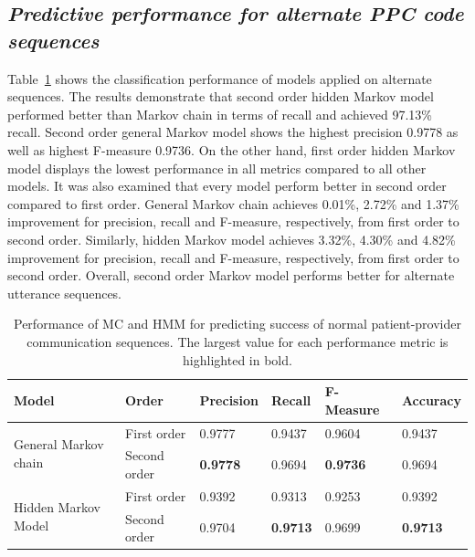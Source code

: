 \documentclass{amia}
\begin{document}
\subsection*{\textit{Predictive performance for alternate PPC code sequences}}
Table~\ref{tab:result_alt_seq} shows the classification performance of models applied on alternate sequences. The results demonstrate that second order hidden Markov model performed better than Markov chain in terms of recall and achieved 97.13\% recall. Second order general Markov model shows the highest precision 0.9778 as well as highest F-measure 0.9736. On the other hand, first order hidden Markov model displays the lowest performance in all metrics compared to all other models. It was also examined that every model perform better in second order compared to first order. General Markov chain achieves 0.01\%, 2.72\% and 1.37\% improvement for precision, recall and F-measure, respectively, from first order to second order. Similarly, hidden Markov model achieves 3.32\%, 4.30\% and 4.82\% improvement for precision, recall and F-measure, respectively, from first order to second order. Overall, second order Markov model performs better for alternate utterance sequences. \\

\begin{table}[h]
\centering
\caption{Performance of MC and HMM for predicting success of normal patient-provider communication sequences. The largest value for each performance metric is highlighted in bold.}
\label{tab:result_alt_seq}
  \begin{tabular}{|l|l|l|l|l|l|}
  \hline
   \textbf{Model} & \textbf{Order}  & \textbf{Precision}  & \textbf{Recall} & \textbf{F-Measure} & \textbf{Accuracy}\\ \hline    
    
 \multirow{2}{*}{General Markov chain} & First order & 0.9777 & 0.9437 & 0.9604 & 0.9437\\\cline{2-6}
 & Second order & \textbf{0.9778} & 0.9694 & \textbf{0.9736} & 0.9694\\ \hline
 \multirow{2}{*}{Hidden Markov Model} & First order & 0.9392 & 0.9313 & 0.9253 & 0.9392\\ \cline{2-6}
 & Second order & 0.9704 & \textbf{0.9713} & 0.9699  & \textbf{0.9713}\\ \hline
 
  \end{tabular}
\end{table}
\end{document}
